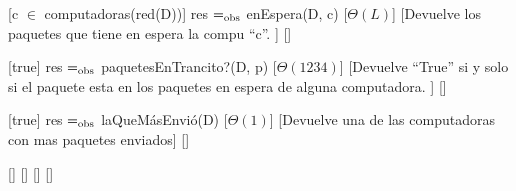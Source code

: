 \begin{Interfaz}
  [c $\in$ computadoras(red(D))]%
  {res $=_{\mathrm{obs}}$ enEspera(D, c)}%
  [$\Theta(L)$]%
  [Devuelve los paquetes que tiene en espera la compu ``c''. ]%
  []%

  [true]%
  {res $=_{\mathrm{obs}}$ paquetesEnTrancito?(D, p)}%
  [$\Theta(1234)$]%
  [Devuelve ``True'' si y solo si el paquete esta en los paquetes en espera de alguna computadora. ]%
  []%

  [true]%
  {res $=_{\mathrm{obs}}$ laQueM\'asEnvi\'o(D)}%
  [$\Theta(1)$]%
  [Devuelve una de las computadoras con mas paquetes enviados]%
  []%

  []%
  {}%
  []%
  []%
  []%

\end{Interfaz}

